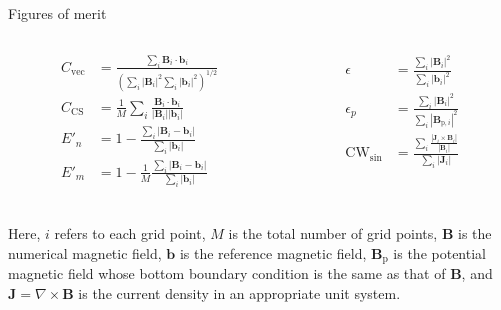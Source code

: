 \documentclass[aspectratio=169, serif]{beamer}
\begin{document}
  \begin{frame}{Figures of merit \parencite{schrijver2006nonlinear}}

    \begin{columns}
        \begin{column}{0.5\textwidth}
            \begin{align*}
                C_\text{vec} & = \frac{\sum_i \mathbf{B}_i \cdot \mathbf{b}_i}{(\sum_i |\mathbf{B}_i|^2 \sum_i |\mathbf{b}_i|^2)^{1/2}} \\
                C_\text{CS} & = \frac{1}{M} \sum_i \frac{\mathbf{B}_i \cdot \mathbf{b}_i}{|\mathbf{B}_i||\mathbf{b}_i|}\\
                E'_n & = 1 - \frac{\sum_i |\mathbf{B}_i - \mathbf{b}_i|}{\sum_i |\mathbf{b}_i|}\\
                E'_m & = 1 - \frac{1}{M} \frac{\sum_i |\mathbf{B}_i - \mathbf{b}_i|}{\sum_i |\mathbf{b}_i|}\\
            \end{align*}
        \end{column}
        \begin{column}{0.5\textwidth}  %

            \begin{align*}
                \epsilon & = \frac{\sum_i |\mathbf{B}_i|^2}{\sum_i |\mathbf{b}_i|^2}\\
                \epsilon_p & = \frac{\sum_i |\mathbf{B}_i|^2}{\sum_i |\mathbf{B}_{\text{p}, i}|^2} \\
                \text{CW}_\text{sin} & = \frac{\sum_i \frac{|\mathbf{J}_i \times \mathbf{B}_i|}{|\mathbf{B}_i|}}{\sum_i |\mathbf{J}_i|}
            \end{align*}
            
        \end{column}
        \end{columns}
        Here, $i$ refers to each grid point, $M$ is the total number of grid points, $\mathbf{B}$ is the numerical magnetic field, $\mathbf{b}$ is the reference magnetic field, $\mathbf{B}_{\text{p}}$ is the potential magnetic field whose bottom boundary condition is the same as that of $\mathbf{B}$, and $\mathbf{J} = \nabla \times \mathbf{B}$ is the current density in an appropriate unit system.
  \end{frame}
\end{document}
